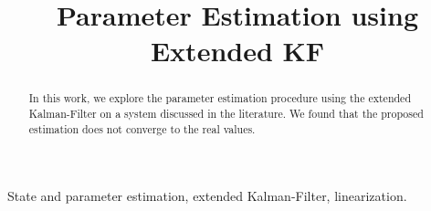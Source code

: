 \documentclass[conference]{IEEEtran}
\begin{document}
\title{Parameter Estimation using Extended KF\\}

\author{
\and
{}
\and
{}
}

\maketitle

\begin{abstract}
In this work, we explore the parameter estimation procedure using the extended Kalman-Filter on a system discussed in the literature. We found that the proposed estimation does not converge to the real values.
\end{abstract}

\begin{IEEEkeywords}
  State and parameter estimation, extended Kalman-Filter, linearization.
\end{IEEEkeywords}






\end{document}
